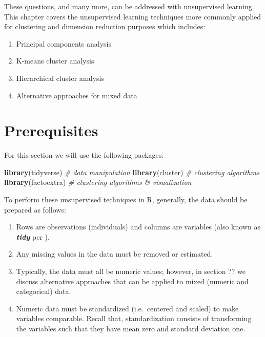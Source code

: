 \documentclass[]{book}
\newenvironment{Shaded}{\begin{snugshade}}{\end{snugshade}}
\newcommand{\CommentTok}[1]{\textcolor[rgb]{0.56,0.35,0.01}{\textit{#1}}}
\newcommand{\KeywordTok}[1]{\textcolor[rgb]{0.13,0.29,0.53}{\textbf{#1}}}
\newcommand{\NormalTok}[1]{#1}
\providecommand{\tightlist}{%
  \setlength{\itemsep}{0pt}\setlength{\parskip}{0pt}}
\theoremstyle{definition}
\theoremstyle{definition}
\theoremstyle{definition}
\theoremstyle{remark}
\begin{document}
These questions, and many more, can be addressed with unsupervised
learning. This chapter covers the unsupervised learning techniques more
commonly applied for clustering and dimension reduction purposes which
includes:

\begin{enumerate}
\def\labelenumi{\arabic{enumi}.}
\tightlist
\item
  Principal components analysis
\item
  K-means cluster analysis
\item
  Hierarchical cluster analysis
\item
  Alternative approaches for mixed data
\end{enumerate}

\hypertarget{prerequisites-2}{%
\section{Prerequisites}\label{prerequisites-2}}

For this section we will use the following packages:

\begin{Shaded}
\begin{Highlighting}[]
\KeywordTok{library}\NormalTok{(tidyverse)  }\CommentTok{# data manipulation}
\KeywordTok{library}\NormalTok{(cluster)    }\CommentTok{# clustering algorithms}
\KeywordTok{library}\NormalTok{(factoextra) }\CommentTok{# clustering algorithms & visualization}
\end{Highlighting}
\end{Shaded}

To perform these unsupervised techniques in R, generally, the data
should be prepared as follows:

\begin{enumerate}
\def\labelenumi{\arabic{enumi}.}
\tightlist
\item
  Rows are observations (individuals) and columns are variables (also
  known as \textbf{\emph{tidy}} per \citet{wickham2014tidy}).
\item
  Any missing values in the data must be removed or estimated.
\item
  Typically, the data must all be numeric values; however, in section ??
  we discuss alternative approaches that can be applied to mixed
  (numeric and categorical) data.
\item
  Numeric data must be standardized (i.e.~centered and scaled) to make
  variables comparable. Recall that, standardization consists of
  transforming the variables such that they have mean zero and standard
  deviation one.
\end{enumerate}
\end{document}
